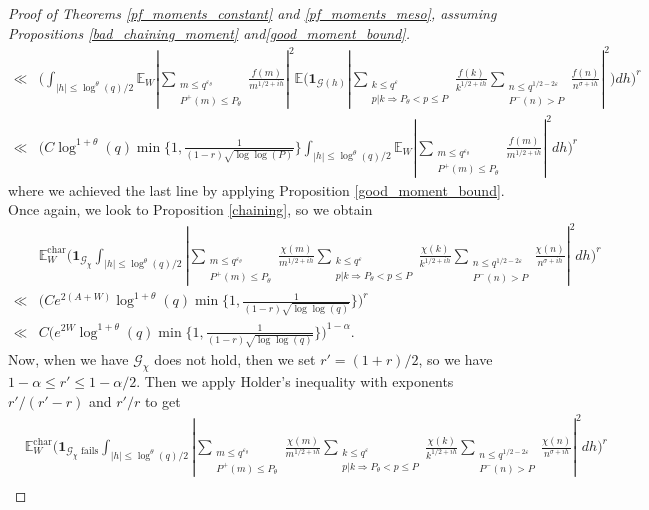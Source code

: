 \documentclass[reqno]{amsart}
\theoremstyle{definition}
\theoremstyle{remark}
\numberwithin{equation}{section}
\theoremstyle{remark}
\begin{document}
\begin{proof}[Proof of Theorems \ref{pf_moments_constant} and \ref{pf_moments_meso}, assuming Propositions \ref{bad_chaining_moment} and\ref{good_moment_bound}]
\begin{align*}
        \ll &\big(\int_{|h|\leq \log^\theta(q)/2}\mathbb{E}_W|\sum_{\substack{m \leq q^{\varepsilon_\theta} \\ P^+(m) \leq P_\theta}}\frac{f(m)}{m^{1/2+ih}}|^2\mathbb{E}\big(\mathbf{1}_{\mathcal{G}(h)}|\sum_{\substack{k \leq q^{\varepsilon} \\ p|k \Rightarrow P_\theta < p \leq P}}\frac{f(k)}{k^{1/2+ih}}\sum_{\substack{n \leq q^{1/2-2\varepsilon} \\ P^{-}(n) > P}}\frac{f(n)}{n^{\sigma+ih}}|^2\big)dh\big)^r \\
        \ll&\big(C\log^{1+\theta}(q)\min\{1,\frac{1}{(1-r)\sqrt{\log\log(P)}}\}\int_{|h| \leq \log^\theta(q)/2}\mathbb{E}_W|\sum_{\substack{m \leq q^{\varepsilon_\theta} \\ P^+(m) \leq P_\theta}}\frac{f(m)}{m^{1/2+ih}}|^2dh\big)^r
    \end{align*}
    where we achieved the last line by applying Proposition \ref{good_moment_bound}. Once again, we look to Proposition \ref{chaining}, so we obtain
    \begin{align*}
        &\mathbb{E}_W^{\text{char}}\big(\mathbf{1}_{\mathcal{G}_\chi}\int_{|h|\leq \log^\theta(q)/2}|\sum_{\substack{m \leq q^{\varepsilon_\theta} \\ P^+(m) \leq P_\theta}}\frac{\chi(m)}{m^{1/2+ih}}\sum_{\substack{k \leq q^{\varepsilon} \\ p|k \Rightarrow P_\theta < p \leq P}}\frac{\chi(k)}{k^{1/2+ih}}\sum_{\substack{n \leq q^{1/2-2\varepsilon} \\ P^{-}(n) > P}}\frac{\chi(n)}{n^{\sigma+ih}}|^2dh\big)^r \\
        \ll& \big(Ce^{2(A+W)}\log^{1+\theta}(q)\min\{1,\frac{1}{(1-r)\sqrt{\log\log(q)}}\}\big)^r \\ \ll& C\big(e^{2W}\log^{1+\theta}(q)\min\{1,\frac{1}{(1-r)\sqrt{\log\log(q)}}\}\big)^{1-\alpha}.
    \end{align*}
    Now, when we have $\mathcal{G}_\chi$ does not hold, then we set $r' = (1+r)/2$, so we have $1-\alpha \leq r' \leq 1-\alpha/2$. Then we apply Holder's inequality with exponents $r'/(r'-r)$ and $r'/r$ to get
    \begin{align*}
        &\mathbb{E}_W^{\text{char}}\big(\mathbf{1}_{\mathcal{G}_\chi \text{ fails}}\int_{|h|\leq \log^\theta(q)/2}|\sum_{\substack{m \leq q^{\varepsilon_\theta} \\ P^+(m) \leq P_\theta}}\frac{\chi(m)}{m^{1/2+ih}}\sum_{\substack{k \leq q^{\varepsilon} \\ p|k \Rightarrow P_\theta < p \leq P}}\frac{\chi(k)}{k^{1/2+ih}}\sum_{\substack{n \leq q^{1/2-2\varepsilon} \\ P^{-}(n) > P}}\frac{\chi(n)}{n^{\sigma+ih}}|^2dh\big)^r \\

\end{align*}
\end{proof}
\end{document}
